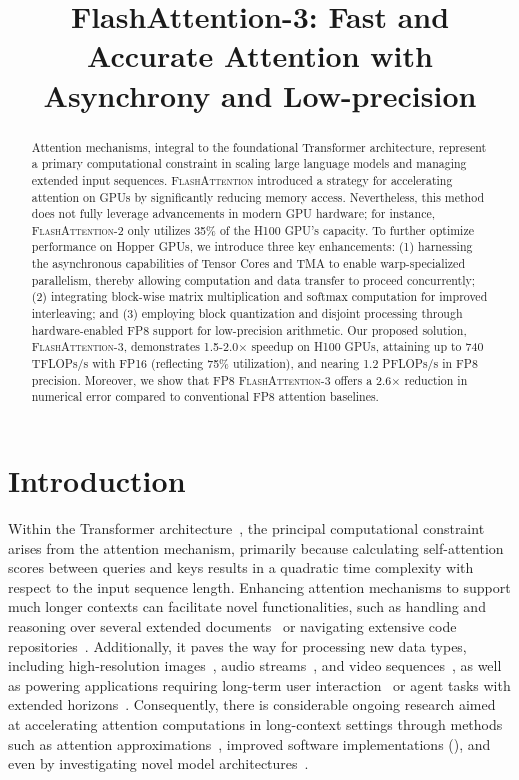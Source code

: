 \title{FlashAttention-3: Fast and Accurate Attention with Asynchrony and Low-precision}

\begin{abstract}
Attention mechanisms, integral to the foundational Transformer architecture, represent a primary computational constraint in scaling large language models and managing extended input sequences. \textsc{FlashAttention} introduced a strategy for accelerating attention on GPUs by significantly reducing memory access. Nevertheless, this method does not fully leverage advancements in modern GPU hardware; for instance, \textsc{FlashAttention-2} only utilizes 35\% of the H100 GPU's capacity. To further optimize performance on Hopper GPUs, we introduce three key enhancements: (1) harnessing the asynchronous capabilities of Tensor Cores and TMA to enable warp-specialized parallelism, thereby allowing computation and data transfer to proceed concurrently; (2) integrating block-wise matrix multiplication and softmax computation for improved interleaving; and (3) employing block quantization and disjoint processing through hardware-enabled FP8 support for low-precision arithmetic. Our proposed solution, \textsc{FlashAttention-3}, demonstrates 1.5-2.0$\times$ speedup on H100 GPUs, attaining up to 740 TFLOPs/s with FP16 (reflecting 75\% utilization), and nearing 1.2 PFLOPs/s in FP8 precision. Moreover, we show that FP8 \textsc{FlashAttention-3} offers a 2.6$\times$ reduction in numerical error compared to conventional FP8 attention baselines.
\end{abstract}

\section{Introduction}
\label{sec:intro}

Within the Transformer architecture~\citep{vaswani2017attention}, the principal computational constraint arises from the attention mechanism, primarily because calculating self-attention scores between queries and keys results in a quadratic time complexity with respect to the input sequence length. Enhancing attention mechanisms to support much longer contexts can facilitate novel functionalities, such as handling and reasoning over several extended documents~\citep{guo2021longt5,shaham2022scrolls,peng2023yarn} or navigating extensive code repositories~\citep{roziere2023code, li2023starcoder}. Additionally, it paves the way for processing new data types, including high-resolution images~\citep{chen2022scaling}, audio streams~\citep{gulati2020conformer}, and video sequences~\citep{ho2022video}, as well as powering applications requiring long-term user interaction~\citep{sun2019bert4rec} or agent tasks with extended horizons~\citep{yao2022react}. Consequently, there is considerable ongoing research aimed at accelerating attention computations in long-context settings through methods such as attention approximations~\citep{katharopoulos2020transformers,choromanski2020rethinking,
tay2020efficient}, improved software implementations (\citep{rabe2021self,dao2022flashattention,kwon2023efficient}), and even by investigating novel model architectures~\citep{peng2023rwkv,sun2023retentive,gu2023mamba}.

